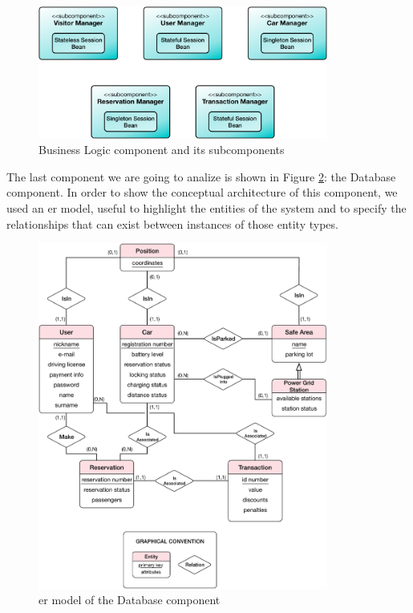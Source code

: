 \begin{figure}[htbp]
\centering
\vspace{104pt}
\includegraphics[width=0.85\textwidth]{Images/BusinessLogicComponent.pdf}
\vspace{10pt}
\caption{Business Logic component and its subcomponents}
\label{fig:business}
\end{figure}
\clearpage

\newline
The last component we are going to analize is shown in Figure \ref{fig:database}: the Database component. In order to show the conceptual architecture of this component, we used an \acl{er} model, useful to highlight the entities of the system and to specify the relationships that can exist between instances of those entity types.

\begin{figure}[htbp]
\centering
\vspace{24pt}
\includegraphics[width=0.85\textwidth]{Images/DatabaseComponent.pdf}
\vspace{10pt}
\caption{\acs{er} model of the Database component}
\label{fig:database}
\end{figure}
\clearpage

